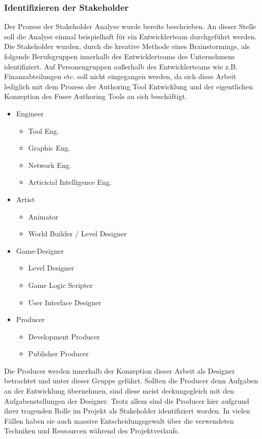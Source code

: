 \documentclass[pagesize, paper=a4, fontsize=12pt, titlepage=true, headings=small, headnosepline, abstractoff, liststotoc, nochapterprefix, plainheadsepline, twoside]{scrreprt}
\begin{document}
\subsubsection{Identifizieren der Stakeholder}
Der Prozess der Stakeholder Analyse wurde bereits beschrieben. An dieser Stelle soll die Analyse einmal beispielhaft für ein Entwicklerteam durchgeführt werden. Die Stakeholder wurden, durch die kreative Methode eines Brainstormings, als folgende Berufsgruppen innerhalb des Entwicklerteams des Unternehmens identifiziert. Auf Personengruppen außerhalb des Entwicklerteams wie z.B. Finanzabteilungen etc. soll nicht eingegangen werden, da sich diese Arbeit lediglich mit dem Prozess der Authoring Tool Entwicklung und der eigentlichen Konzeption des Fusee Authoring Tools an sich beschäftigt.
\begin{itemize}
\item Engineer
	\begin{itemize}
	\item Tool Eng.
	\item Graphic Eng.
	\item Network Eng.
	\item Articicial Intelligence Eng.
	\end{itemize}
\item Artist
	\begin{itemize}
	\item Animator
	\item World Builder / Level Designer
	\end{itemize}
\item Game-Designer
	\begin{itemize}
	\item Level Designer
	\item Game Logic Scripter
	\item User Interface Designer
	\end{itemize}
\item Producer
	\begin{itemize}
	\item Development Producer
	\item Publisher Producer
	\end{itemize}
\end{itemize}
Die Producer werden innerhalb der Konzeption dieser Arbeit als Designer betrachtet und unter dieser Gruppe geführt. Sollten die Producer denn Aufgaben an der Entwicklung übernehmen, sind diese meist deckungsgleich mit den Aufgabenstellungen der Designer. Trotz allem sind die Producer hier aufgrund ihrer tragenden Rolle im Projekt als Stakeholder identifiziert worden. In vielen Fällen haben sie auch massive Entscheidungsgewalt über die verwendeten Techniken und Ressourcen während des Projektverlaufs.
\end{document}
